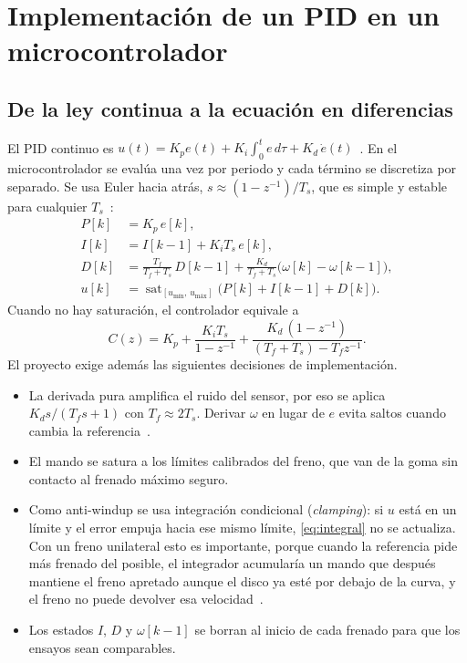 \section{Implementación de un PID en un microcontrolador}
\label{sec:p3}

\subsection{De la ley continua a la ecuación en diferencias}
El PID continuo es
$u(t)=K_p e(t) + K_i\int_0^t e\,d\tau + K_d\,\dot e(t)$~\cite{astrom2006advanced}.
En el microcontrolador se evalúa una vez por periodo y cada término se discretiza por
separado. Se usa Euler hacia atrás, $s\approx(1-z^{-1})/T_s$, que es simple y estable para
cualquier $T_s$~\cite{astrom1997computer,ogata1996discreto}:
\begin{align}
  P[k] &= K_p\,e[k], \\
  I[k] &= I[k-1] + K_i T_s\,e[k], \label{eq:integral}\\
  D[k] &= \frac{T_f}{T_f+T_s}\,D[k-1] + \frac{K_d}{T_f+T_s}\big(\omega[k]-\omega[k-1]\big), \label{eq:derivada}\\
  u[k] &= \operatorname{sat}_{[u_\text{mín},\,u_\text{máx}]}\big(P[k]+I[k-1]+D[k]\big).
\end{align}
Cuando no hay saturación, el controlador equivale a
\begin{equation}
  C(z) = K_p + \frac{K_i T_s}{1-z^{-1}} + \frac{K_d\,(1-z^{-1})}{(T_f+T_s) - T_f z^{-1}}.
\end{equation}
El proyecto exige además las siguientes decisiones de implementación.
\begin{itemize}
  \item La derivada pura amplifica el ruido
  del sensor, por eso se aplica $K_d s/(T_f s+1)$ con $T_f\approx 2T_s$. Derivar $\omega$ en
  lugar de $e$ evita saltos cuando cambia la referencia~\cite{astrom2006advanced}.
  \item El mando se satura a los límites calibrados del freno, que van de la goma sin contacto al
  frenado máximo seguro.
  \item Como anti-windup se usa integración condicional (\emph{clamping}): si $u$ está en un límite
  y el error empuja hacia ese mismo límite, \eqref{eq:integral} no se actualiza. Con un freno
  unilateral esto es importante, porque cuando la referencia pide más frenado del posible, el integrador
  acumularía un mando que después mantiene el freno apretado aunque el disco ya esté por debajo
  de la curva, y el freno no puede devolver esa velocidad~\cite{astrom2006advanced,astrom2021feedback}.
  \item Los estados $I$, $D$ y $\omega[k-1]$ se borran al inicio de cada
  frenado para que los ensayos sean comparables.
\end{itemize}

